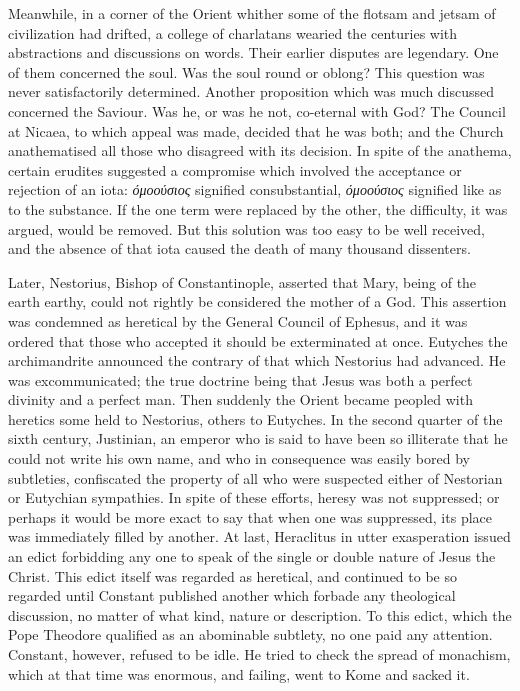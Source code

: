 \documentclass[]{book}
\begin{document}
Meanwhile, in a corner of the Orient whither some of the flotsam and
jetsam of civilization had drifted, a college of charlatans wearied the
centuries with abstractions and discussions on words. Their earlier
disputes are legendary. One of them concerned the soul. Was the soul
round or oblong? This question was never satisfactorily determined.
Another proposition which was much discussed concerned the Saviour. Was
he, or was he not, co-eternal with God? The Council at Nicaea, to which
appeal was made, decided that he was both; and the Church anathematised
all those who disagreed with its decision. In spite of the anathema,
certain erudites suggested a compromise which involved the acceptance or
rejection of an iota: \emph{όμοούσιος} signified consubstantial,
\emph{όμοούσιος} signified like as to the substance. If the one term
were replaced by the other, the difficulty, it was argued, would be
removed. But this solution was too easy to be well received, and the
absence of that iota caused the death of many thousand dissenters.

Later, Nestorius, Bishop of Constantinople, asserted that Mary, being of
the earth earthy, could not rightly be considered the mother of a God.
This assertion was condemned as heretical by the General Council of
Ephesus, and it was ordered that those who accepted it should be
exterminated at once. Eutyches the archimandrite announced the contrary
of that which Nestorius had advanced. He was excommunicated; the true
doctrine being that Jesus was both a perfect divinity and a perfect man.
Then suddenly the Orient became peopled with heretics some held to
Nestorius, others to Eutyches. In the second quarter of the sixth
century, Justinian, an emperor who is said to have been so illiterate
that he could not write his own name, and who in consequence was easily
bored by subtleties, confiscated the property of all who were suspected
either of Nestorian or Eutychian sympathies. In spite of these efforts,
heresy was not suppressed; or perhaps it would be more exact to say that
when one was suppressed, its place was immediately filled by another. At
last, Heraclitus in utter exasperation issued an edict forbidding any
one to speak of the single or double nature of Jesus the Christ. This
edict itself was regarded as heretical, and continued to be so regarded
until Constant published another which forbade any theological
discussion, no matter of what kind, nature or description. To this
edict, which the Pope Theodore qualified as an abominable subtlety, no
one paid any attention. Constant, however, refused to be idle. He tried
to check the spread of monachism, which at that time was enormous, and
failing, went to Kome and sacked it.
\end{document}

